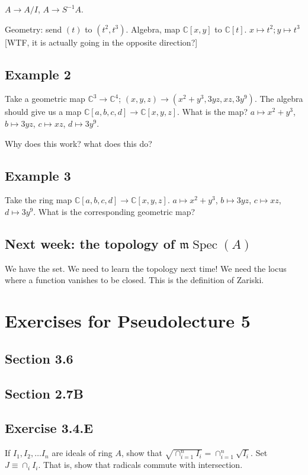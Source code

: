 \documentclass{book}
\newcommand{\C}{\ensuremath{\mathbb{C}}}
\newcommand{\m}{\mathfrak{m}}
\newcommand{\mspec}{\m\operatorname{Spec}}
\theoremstyle{definition}
\begin{document}
$A \rightarrow A/I$, $A \rightarrow S^{-1} A$.

Geometry: send $(t)$ to $(t^2, t^3)$. Algebra, map $\C[x, y]$ to $\C[t]$.
$x \mapsto t^2; y \mapsto t^3$ [WTF, it is actually going in the opposite direction?]

\section{Example 2}
Take a geometric map $\C^3 \rightarrow \C^4$; $(x, y, z) \rightarrow (x^2 + y^3, 3yz, xz, 3y^9)$.
The algebra should give us a map $\C[a, b, c, d] \rightarrow \C[x, y, z]$. What 
is the map? $a \mapsto x^2 + y^3$, $b \mapsto 3yz$, $c \mapsto xz$, $d \mapsto 3y^9$.

Why does this work? what does this do?


\section{Example 3}
Take the ring map 
$\C[a, b, c, d] \rightarrow \C[x, y, z]$. $a \mapsto x^2 + y^3$, $b \mapsto 3yz$, $c \mapsto xz$, $d \mapsto 3y^9$. 
What is the corresponding geometric map?

\section{Next week: the topology of $\mspec(A)$}

We have the set. We need to learn the topology next time! We need the
locus where a function vanishes to be closed. This is the definition of Zariski.

\chapter{Exercises for Pseudolecture 5}

\section{Section 3.6}
\section{Section 2.7B}
\section{Exercise 3.4.E}
If $I_1, I_2, \dots I_n$ are ideals of ring $A$, show that $\sqrt{\cap_{i=1}^n I_i} = \cap_{i=1}^n \sqrt{I_i}$.
Set $J \equiv \cap_i I_i$.  That is, show that radicals commute with intersection.
\end{document}
